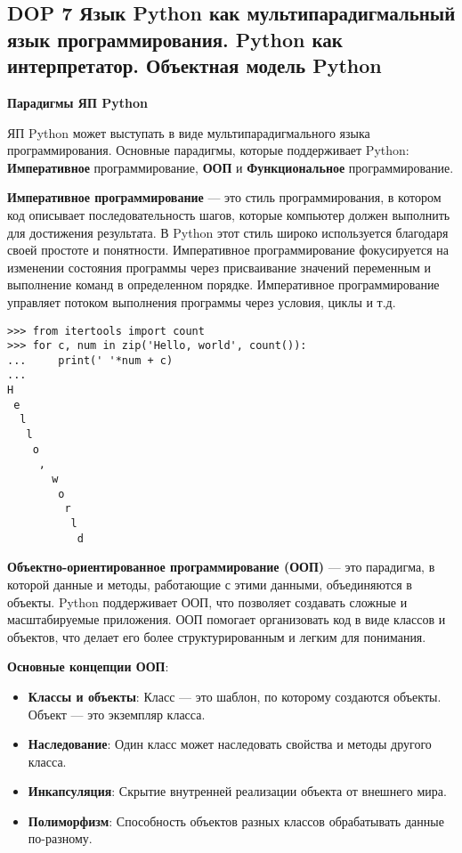\subsection*{DOP 7 Язык Python как мультипарадигмальный язык программирования. Python как интерпретатор. Объектная модель Python}


\textbf{Парадигмы ЯП Python}

ЯП Python может выступать в виде мультипарадигмального языка программирования. Основные парадигмы, которые поддерживает Python: \textbf{Императивное} программирование, \textbf{ООП} и \textbf{Функциональное} программирование.

\textbf{Императивное программирование} — это стиль программирования, в котором код описывает последовательность шагов, которые компьютер должен выполнить для достижения результата. В Python этот стиль широко используется благодаря своей простоте и понятности. Императивное программирование фокусируется на изменении состояния программы через присваивание значений переменным и выполнение команд в определенном порядке. Императивное программирование управляет потоком выполнения программы через условия, циклы и т.д.

\begin{verbatim}
>>> from itertools import count
>>> for c, num in zip('Hello, world', count()):
...     print(' '*num + c)
...
H
 e
  l
   l
    o
     ,
       w
        o
         r
          l
           d
\end{verbatim}

\textbf{Объектно-ориентированное программирование (ООП)} — это парадигма, в которой данные и методы, работающие с этими данными, объединяются в объекты. Python поддерживает ООП, что позволяет создавать сложные и масштабируемые приложения. ООП помогает организовать код в виде классов и объектов, что делает его более структурированным и легким для понимания.

\textbf{Основные концепции ООП}:
\begin{itemize}
    \item \textbf{Классы и объекты}: Класс — это шаблон, по которому создаются объекты. Объект — это экземпляр класса.
    \item \textbf{Наследование}: Один класс может наследовать свойства и методы другого класса.
    \item \textbf{Инкапсуляция}: Скрытие внутренней реализации объекта от внешнего мира.
    \item \textbf{Полиморфизм}: Способность объектов разных классов обрабатывать данные по-разному.
\end{itemize}

